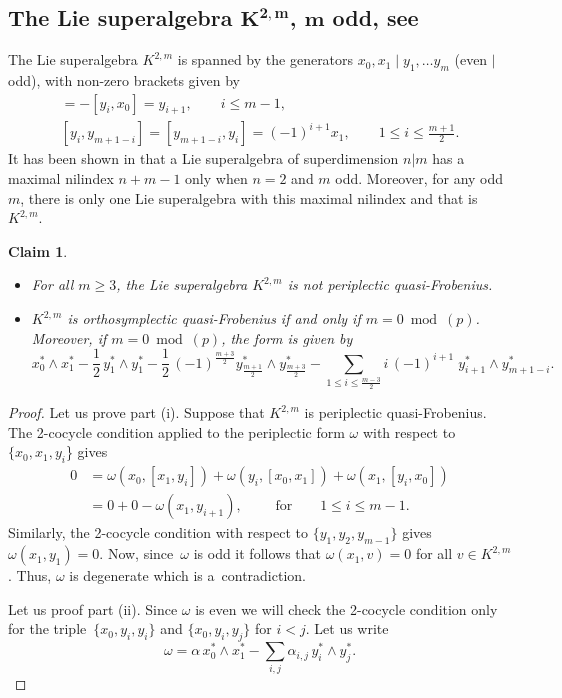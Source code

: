 \documentclass[pdftex]{sigma}
\numberwithin{equation}{section}
\newtheorem{Claim}[Theorem]{Claim}
\begin{document}
\subsection[The Lie superalgebra K\^{}\{2,m\}, m odd, see \protect{[28]}]{The Lie superalgebra $\boldsymbol{K^{2,m}}$, $\boldsymbol{m}$ odd, see \cite{GKN}}
The Lie superalgebra $K^{2,m}$ is spanned by the generators $x_0, x_1\mid y_1,\ldots y_m$ (even $|$ odd), with non-zero brackets given by
\begin{gather*}
[x_0, y_i] = -[y_i, x_0] = y_{i+1},\qquad i\leq m-1, \\
[y_i, y_{m+1-i}] = [ y_{m+1-i}, y_i] = (-1)^{i+1}x_1, \qquad 1 \leq i\leq \frac{m+1}{2}.
\end{gather*}
It has been shown in \cite{GKN} that a Lie superalgebra of superdimension $n|m$ has a maximal nilindex $n + m-1$ only when $n=2$ and $m$ odd. Moreover, for any odd $m$, there is only one Lie superalgebra with this maximal nilindex and that is $K^{2,m}$.
\begin{Claim}\qquad
\begin{itemize}\itemsep=0pt
\item[$(i)$] For all $m\geq 3$, the Lie superalgebra $K^{2,m}$ is not periplectic quasi-Frobenius.
\item[$(ii)$] $K^{2,m}$ is orthosymplectic quasi-Frobenius if and only if $m=0 \bmod(p)$. Moreover, if ${m=0} \bmod(p)$, the form is given by
\[
x_0^* \wedge x_1^* - \frac{1}{2}\,y_1^* \wedge y_1^*- \frac{1}{2}\,(-1)^{\frac{m+3}{2}}y_{\frac{m+1}{2}}^* \wedge y_{\frac{m+3}{2}}^* - \sum_{1\leq i \leq \frac{m-3}{2}} i \, (-1)^{i+1}\; y_{i+1}^* \wedge y_{m+1-i}^*.
\]
\end{itemize}
\end{Claim}
\begin{proof} Let us prove part (i). Suppose that $K^{2,m}$ is periplectic quasi-Frobenius. The 2-cocycle condition applied to the periplectic form $\omega$ with respect to $\{x_0, x_1, y_i$\} gives
\begin{align*}
0&=\omega(x_0, [x_1, y_i])+ \omega (y_i, [x_0,x_1])+\omega (x_1, [y_i, x_0])\\
&=0+0-\omega(x_1, y_{i+1}), \qquad \text{ for}\qquad 1\leq i \leq m-1.
\end{align*}
Similarly, the 2-cocycle condition with respect to $\{y_1, y_2, y_{m-1} \}$ gives $\omega(x_1,y_1)=0$. Now, since~$\omega$ is odd it follows that $\omega(x_1, v)=0$ for all $v \in K^{2,m}$. Thus, $\omega$ is degenerate which is a~contradiction.

Let us proof part (ii). Since $\omega$ is even we will check the 2-cocycle condition only for the triple~$\{x_0, y_i, y_i\}$ and $\{x_0, y_i, y_j\}$ for $i<j$. Let us write
\[
\omega= \alpha \, x^*_0\wedge x^*_1 - \sum_{i,j} \alpha_{i,j} \, y^*_i \wedge y^*_j.\tag*{\qed}
\]\renewcommand{\qed}{}
\end{proof}
\end{document}
